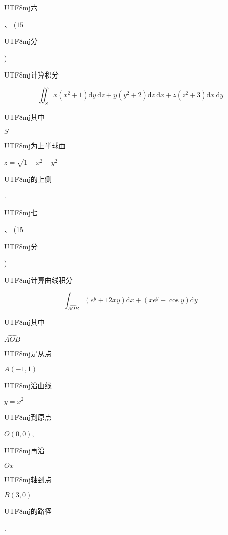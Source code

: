 \documentclass[10pt]{article}
\begin{document}
\begin{CJK}{UTF8}{mj}六\end{CJK}、 $(15$ \begin{CJK}{UTF8}{mj}分\end{CJK}) \begin{CJK}{UTF8}{mj}计算积分\end{CJK}
$$
\iint_{S} x\left(x^{2}+1\right) \mathrm{d} y \mathrm{~d} z+y\left(y^{2}+2\right) \mathrm{d} z \mathrm{~d} x+z\left(z^{2}+3\right) \mathrm{d} x \mathrm{~d} y
$$
\begin{CJK}{UTF8}{mj}其中\end{CJK} $S$ \begin{CJK}{UTF8}{mj}为上半球面\end{CJK} $z=\sqrt{1-x^{2}-y^{2}}$ \begin{CJK}{UTF8}{mj}的上侧\end{CJK}.

\begin{CJK}{UTF8}{mj}七\end{CJK}、 (15 \begin{CJK}{UTF8}{mj}分\end{CJK}) \begin{CJK}{UTF8}{mj}计算曲线积分\end{CJK}
$$
\int_{\widehat{A O B}}\left(e^{y}+12 x y\right) \mathrm{d} x+\left(x e^{y}-\cos y\right) \mathrm{d} y
$$
\begin{CJK}{UTF8}{mj}其中\end{CJK} $\widehat{A O B}$ \begin{CJK}{UTF8}{mj}是从点\end{CJK} $A(-1,1)$ \begin{CJK}{UTF8}{mj}沿曲线\end{CJK} $y=x^{2}$ \begin{CJK}{UTF8}{mj}到原点\end{CJK} $O(0,0)$, \begin{CJK}{UTF8}{mj}再沿\end{CJK} $O x$ \begin{CJK}{UTF8}{mj}轴到点\end{CJK} $B(3,0)$ \begin{CJK}{UTF8}{mj}的路径\end{CJK}.
\end{document}
